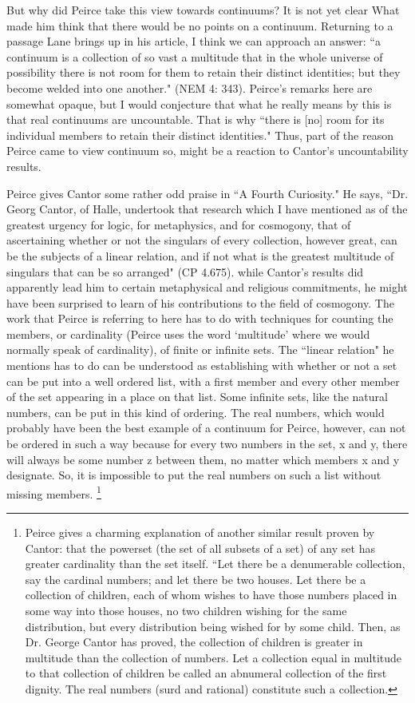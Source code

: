 \documentclass[12pt]{article}
\begin{document}
But why did Peirce take this view towards continuums? It is not yet clear What made him think that there would be no points on a continuum. Returning to a passage Lane brings up in his article, I think we can approach an answer: ``a continuum is a collection of so vast a multitude that in the whole universe of possibility there is not room for them to retain their distinct identities; but they become welded into one another." (NEM 4: 343). Peirce's remarks here are somewhat opaque, but I would conjecture that what he really means by this is that real continuums are uncountable. That is why ``there is [no] room for its individual members to retain their distinct identities." Thus, part of the reason Peirce came to view continuum so, might be a reaction to Cantor's uncountability results. 

Peirce gives Cantor some rather odd praise in ``A Fourth Curiosity." He says, ``Dr. Georg Cantor, of Halle, undertook that research which I have mentioned as of the greatest urgency for logic, for metaphysics, and for cosmogony, that of ascertaining whether or not the singulars of every collection, however great, can be the subjects of a linear relation, and if not what is the greatest multitude of singulars that can be so arranged" (CP 4.675). while Cantor's results did apparently lead him to certain metaphysical and religious commitments, he might have been surprised to learn of his contributions to the field of cosmogony. The work that Peirce is referring to here has to do with techniques for counting the members, or cardinality (Peirce uses the word `multitude' where we would normally speak of cardinality), of finite or infinite sets. The ``linear relation" he mentions has to do can be understood as establishing with whether or not a set can be put into a well ordered list, with a first member and every other member of the set appearing in a place on that list. Some infinite sets, like the natural numbers, can be put in this kind of ordering. The real numbers, which would probably have been the best example of a continuum for Peirce, however, can not be ordered in such a way because for every two numbers in the set, x and y, there will always be some number z between them, no matter which members x and y designate. So, it is impossible to put the real numbers on such a list without missing members. \footnote{Peirce gives a charming explanation of another similar result proven by Cantor: that the powerset (the set of all subsets of a set) of any set has greater cardinality than the set itself. ``Let there be a denumerable collection, say the cardinal numbers; and let there be two houses. Let there be a collection of children, each of whom wishes to have those numbers placed in some way into those houses, no two children wishing for the same distribution, but every distribution being wished for by some child. Then, as Dr. George Cantor has proved, the collection of children is greater in multitude than the collection of numbers. Let a collection equal in multitude to that collection of children be called an abnumeral collection of the first dignity. The real numbers (surd and rational) constitute such a collection.

}
\end{document}
